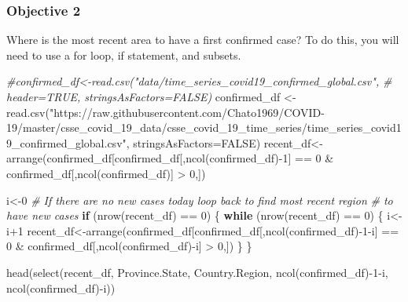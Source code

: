 \documentclass[
]{article}
\newenvironment{Shaded}{\begin{snugshade}}{\end{snugshade}}
\newcommand{\AttributeTok}[1]{\textcolor[rgb]{0.77,0.63,0.00}{#1}}
\newcommand{\CommentTok}[1]{\textcolor[rgb]{0.56,0.35,0.01}{\textit{#1}}}
\newcommand{\ConstantTok}[1]{\textcolor[rgb]{0.00,0.00,0.00}{#1}}
\newcommand{\ControlFlowTok}[1]{\textcolor[rgb]{0.13,0.29,0.53}{\textbf{#1}}}
\newcommand{\DecValTok}[1]{\textcolor[rgb]{0.00,0.00,0.81}{#1}}
\newcommand{\FunctionTok}[1]{\textcolor[rgb]{0.00,0.00,0.00}{#1}}
\newcommand{\NormalTok}[1]{#1}
\newcommand{\OtherTok}[1]{\textcolor[rgb]{0.56,0.35,0.01}{#1}}
\newcommand{\SpecialCharTok}[1]{\textcolor[rgb]{0.00,0.00,0.00}{#1}}
\newcommand{\StringTok}[1]{\textcolor[rgb]{0.31,0.60,0.02}{#1}}
\begin{document}
\hypertarget{objective-2}{%
\subsubsection{Objective 2}\label{objective-2}}

Where is the most recent area to have a first confirmed case? To do
this, you will need to use a for loop, if statement, and subsets.

\begin{Shaded}
\begin{Highlighting}[]
\CommentTok{\#confirmed\_df\textless{}{-}read.csv("data/time\_series\_covid19\_confirmed\_global.csv", }
\CommentTok{\#                       header=TRUE, stringsAsFactors=FALSE)}
\NormalTok{confirmed\_df }\OtherTok{\textless{}{-}} \FunctionTok{read.csv}\NormalTok{(}\StringTok{"https://raw.githubusercontent.com/Chato1969/COVID{-}19/master/csse\_covid\_19\_data/csse\_covid\_19\_time\_series/time\_series\_covid19\_confirmed\_global.csv"}\NormalTok{, }\AttributeTok{stringsAsFactors=}\ConstantTok{FALSE}\NormalTok{)}
\NormalTok{recent\_df}\OtherTok{\textless{}{-}}\FunctionTok{arrange}\NormalTok{(confirmed\_df[confirmed\_df[,}\FunctionTok{ncol}\NormalTok{(confirmed\_df)}\SpecialCharTok{{-}}\DecValTok{1}\NormalTok{] }\SpecialCharTok{==} \DecValTok{0} 
                                \SpecialCharTok{\&}\NormalTok{ confirmed\_df[,}\FunctionTok{ncol}\NormalTok{(confirmed\_df)] }\SpecialCharTok{\textgreater{}} \DecValTok{0}\NormalTok{,])}

\NormalTok{i}\OtherTok{\textless{}{-}}\DecValTok{0}
\CommentTok{\# If there are no new cases today loop back to find most recent region}
\CommentTok{\# to have new cases}
\ControlFlowTok{if}\NormalTok{ (}\FunctionTok{nrow}\NormalTok{(recent\_df) }\SpecialCharTok{==} \DecValTok{0}\NormalTok{) \{}
  \ControlFlowTok{while}\NormalTok{ (}\FunctionTok{nrow}\NormalTok{(recent\_df) }\SpecialCharTok{==} \DecValTok{0}\NormalTok{) \{}
\NormalTok{    i}\OtherTok{\textless{}{-}}\NormalTok{i}\SpecialCharTok{+}\DecValTok{1}
\NormalTok{    recent\_df}\OtherTok{\textless{}{-}}\FunctionTok{arrange}\NormalTok{(confirmed\_df[confirmed\_df[,}\FunctionTok{ncol}\NormalTok{(confirmed\_df)}\SpecialCharTok{{-}}\DecValTok{1}\SpecialCharTok{{-}}\NormalTok{i] }\SpecialCharTok{==} \DecValTok{0} 
                                \SpecialCharTok{\&}\NormalTok{ confirmed\_df[,}\FunctionTok{ncol}\NormalTok{(confirmed\_df)}\SpecialCharTok{{-}}\NormalTok{i] }\SpecialCharTok{\textgreater{}} \DecValTok{0}\NormalTok{,])}
\NormalTok{  \}}
\NormalTok{\}}

\FunctionTok{head}\NormalTok{(}\FunctionTok{select}\NormalTok{(recent\_df, Province.State, Country.Region, }\FunctionTok{ncol}\NormalTok{(confirmed\_df)}\SpecialCharTok{{-}}\DecValTok{1}\SpecialCharTok{{-}}\NormalTok{i, }
            \FunctionTok{ncol}\NormalTok{(confirmed\_df)}\SpecialCharTok{{-}}\NormalTok{i))}
\end{Highlighting}
\end{Shaded}
\end{document}
